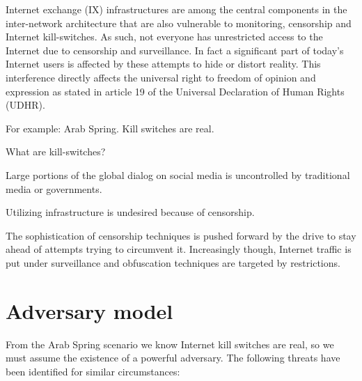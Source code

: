 Internet exchange (IX) infrastructures are among the central components in the inter-network architecture that are also vulnerable to monitoring, censorship and Internet kill-switches.
As such, not everyone has unrestricted access to the Internet due to censorship and surveillance.
In fact a significant part of today's Internet users is affected by these attempts to hide or distort reality. %
This interference directly affects the universal right to freedom of opinion and expression as stated in article 19 of the Universal Declaration of Human Rights (UDHR).


For example: Arab Spring. Kill switches are real. \cite{Egypt left internet}

What are kill-switches?


Large portions of the global dialog on social media is uncontrolled by traditional media or governments.

Utilizing infrastructure is undesired because of censorship.


The sophistication of censorship techniques is pushed forward by the drive to stay ahead of attempts trying to circumvent it.
Increasingly though, Internet traffic is put under surveillance and obfuscation techniques are targeted by restrictions.


\section{Adversary model}\label{sec:adversary_model}
From the Arab Spring scenario we know Internet kill switches are real, so we must assume the existence of a powerful adversary.
The following threats \cite{ietf-shadow-internet} have been identified for similar circumstances:

